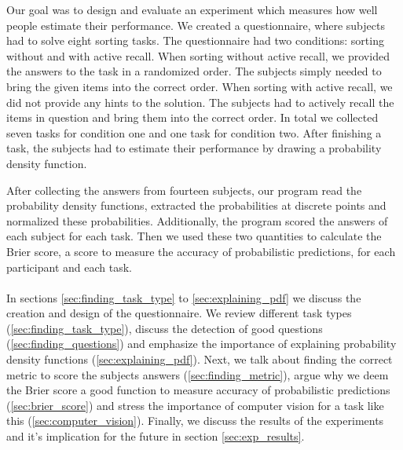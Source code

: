 \documentclass[../main/main.tex]{subfiles}
\begin{document}
%	
	
	\noindent Our goal was to design and evaluate an experiment which measures how well people estimate their performance. We created a questionnaire, where subjects had to solve eight sorting tasks. The questionnaire had two conditions: sorting without and with active recall. When sorting without active recall, we provided the answers to the task in a randomized order. The subjects simply needed to bring the given items into the correct order. When sorting with active recall, we did not provide any hints to the solution. The subjects had to actively recall the items in question and bring them into the correct order. In total we collected seven tasks for condition one and one task for condition two. After finishing a task, the subjects had to estimate their performance by drawing a probability density function. 
	
	After collecting the answers from fourteen subjects, our program read the probability density functions, extracted the probabilities at discrete points and normalized these probabilities. Additionally, the program scored the answers of each subject for each task. Then we used these two quantities to calculate the Brier score, a score to measure the accuracy of probabilistic predictions, for each participant and each task.
	\\\\
	In sections \ref{sec:finding_task_type} to \ref{sec:explaining_pdf} we discuss the creation and design of the questionnaire. We review different task types (\ref{sec:finding_task_type}), discuss the detection of good questions (\ref{sec:finding_questions}) and emphasize the importance of explaining probability density functions (\ref{sec:explaining_pdf}). Next, we talk about finding the correct metric to score the subjects answers (\ref{sec:finding_metric}), argue why we deem the Brier score a good function to measure accuracy of probabilistic predictions (\ref{sec:brier_score}) and stress the importance of computer vision for a task like this (\ref{sec:computer_vision}). Finally, we discuss the results of the experiments and it's implication for the future in section \ref{sec:exp_results}.
	
\end{document}
